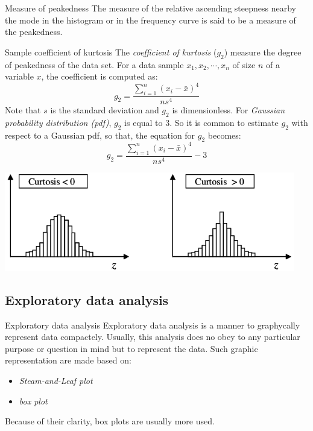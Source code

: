 \documentclass[8pt]{beamer}
\begin{document}
\begin{frame}{Measure of peakedness}
The measure of the relative ascending steepness nearby the mode in the histogram or in the frequency curve is said to be a measure of the peakedness.
    \begin{block}{Sample coefficient of kurtosis}
        The \emph{coefficient of kurtosis} ($g_2$) measure the degree of peakedness of the data set. For a data sample $x_1, x_2, \cdots, x_n$ of size $n$ of a variable $x$, the coefficient is computed as:
        $$
        g_2 = \frac{\sum_{i=1}^n \left(x_i - \bar{x} \right)^4}{n s^4}
        $$
        Note that $s$ is the standard deviation and $g_2$ is dimensionless. For \emph{Gaussian probability distribution (pdf)}, $g_2$ is equal to 3. So it is common to estimate $g_2$ with respect to a Gaussian pdf, so that, the equation for $g_2$ becomes:
        $$
        g_2 = \frac{\sum_{i=1}^n \left(x_i - \bar{x} \right)^4}{n s^4} - 3
        $$

        \vspace{-0.3cm}
        \includegraphics[width=0.95\textwidth]{fiBi27.png}
        \vspace{-0.3cm}
    \end{block}
\end{frame}

\subsection{Exploratory data analysis}
\begin{frame}{Exploratory data analysis}
Exploratory data analysis is a manner to graphycally represent data  compactely. Usually, this analysis does no obey to any particular purpose or question in mind but to represent the data. Such graphic representation are made based on:
\begin{itemize}
    \item \emph{Steam-and-Leaf plot}
    \item \emph{box plot}
\end{itemize}
Because of their clarity, box plots are usually more used.
\end{frame}
\end{document}

